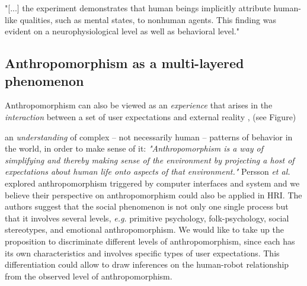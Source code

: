 \documentclass[twocolumn]{svjour3}          %
\begin{document}
	
	

	


	

	"[...] the experiment demonstrates that human beings implicitly attribute human-like qualities, such as mental states, to nonhuman agents. This finding was evident on a neurophysiological level as well as behavioral level." \cite{hegel_understanding_2008}
	


\subsection{Anthropomorphism as a multi-layered phenomenon}
\label{sec:3.4}

Anthropomorphism can also be viewed as an \textit{experience} that arises in the \textit{interaction} between a set of user expectations and external reality \cite{persson_anthropomorphism_2000}, (see Figure)

an \textit{understanding} of complex -- not necessarily human -- patterns of behavior in the world, in order to make sense of it: \textit{"Anthropomorphism is a way of simplifying and thereby making sense of the environment by projecting a host of expectations about human life onto aspects of that environment."} \cite{persson_anthropomorphism_2000}
Persson \textit{et al.} explored anthropomorphism triggered by computer interfaces and system and we believe their perspective on anthropomorphism could also be applied in HRI. The authors suggest that the social phenomenon is not only one single process but that it involves several levels, \textit{e.g.} primitive psychology, folk-psychology, social stereotypes, and emotional anthropomorphism. We would like to take up the proposition to discriminate different levels of anthropomorphism, since each has its own characteristics and involves specific types of user expectations. This differentiation could allow to draw inferences on the human-robot relationship from the observed level of anthropomorphism.
\end{document}
